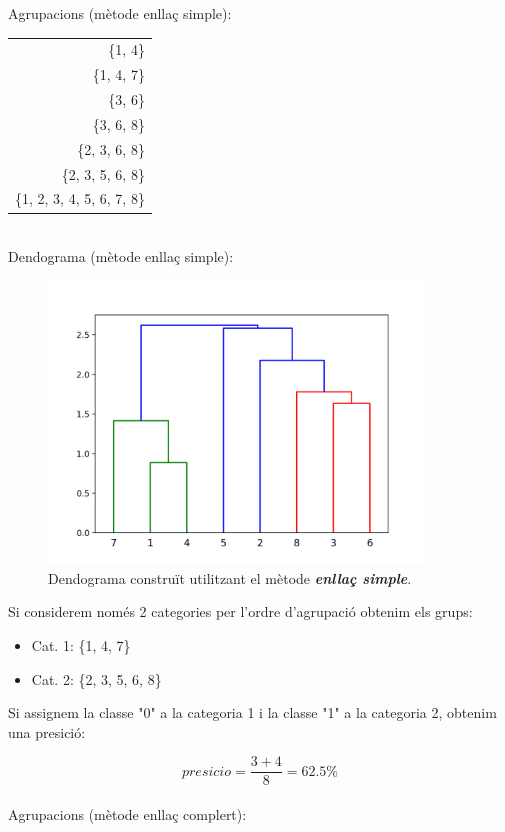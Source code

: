 \documentclass{article} %
\begin{document}
{	Agrupacions (mètode enllaç simple): 

	{\selectfont\small
	\begin{tabular}{r}
		\{1, 4\} \\
		\{1, 4, 7\} \\
		\{3, 6\} \\
		\{3, 6, 8\} \\
		\{2, 3, 6, 8\} \\
        \{2, 3, 5, 6, 8\} \\
 		\{1, 2, 3, 4, 5, 6, 7, 8\} \\
	\end{tabular}
	} \\

	Dendograma (mètode enllaç simple):

	\begin{figure}[H]
		\includegraphics[width=10cm]{single}
		\centering
		\color{blue}
		\caption{Dendograma construït utilitzant el mètode \textbf{\textit{enllaç simple}}.}\label{visina8}
	\end{figure}

	Si considerem només 2 categories per l'ordre d'agrupació obtenim els grups:

	\begin{itemize}
		\item[] Cat. 1: \{1, 4, 7\}
		\item[] Cat. 2: \{2, 3, 5, 6, 8\}
	\end{itemize}

	Si assignem la classe "0" a la categoria 1 i la classe "1" a la categoria 2, obtenim una presició:

	\[presicio = \frac{3 + 4}{8} = 62.5\%\] \\

	Agrupacions (mètode enllaç complert):

}
\end{document}
